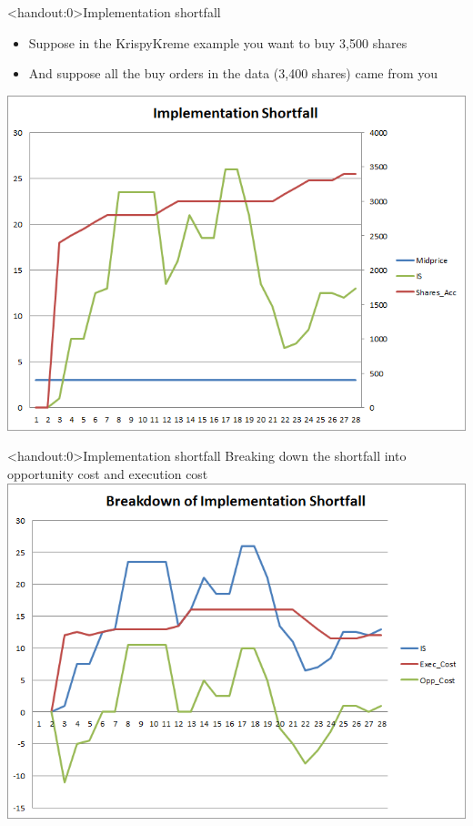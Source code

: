 \documentclass[english,10pt
,aspectratio=169
]{beamer}
\begin{document}
\begin{frame}<handout:0>{Implementation shortfall}
	\begin{itemize}
		\item Suppose in the KrispyKreme example you want to buy 3,500 shares
		\item And suppose all the buy orders in the data (3,400 shares) came from you
	\end{itemize}
	\center
	\includegraphics[scale=0.39]{pics/L2_is}
\end{frame}


\begin{frame}<handout:0>{Implementation shortfall}
	Breaking down the shortfall into opportunity cost and execution cost
	\center
	\includegraphics[scale=0.39]{pics/L2_is2}
\end{frame}
	
\end{document}
